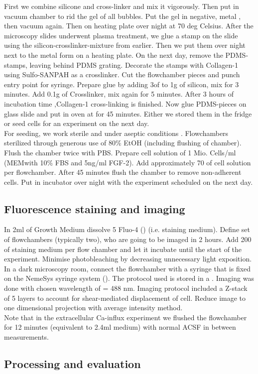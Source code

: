 First we combine silicone  and cross-linker  and mix it vigorously. Then put in vacuum chamber to rid the gel of all bubbles. Put the gel in negative, metal , then vacuum again. Then on heating plate over night at 70 deg Celsius. After the microscopy slides underwent plasma treatment, we glue a stamp on the slide using the silicon-crosslinker-mixture from earlier. Then we put them over night next to the metal form on a heating plate. On the next day, remove the PDMS-stamps, leaving behind PDMS grating. Decorate the stamps with Collagen-1  using Sulfo-SANPAH as a crosslinker. Cut the flowchamber pieces and punch entry point for syringe. Prepare glue by adding 3\mul of  to 1g of silicon, mix for 3 minutes. Add 0.1g of Crosslinker, mix again for 5 minutes. After 3 hours of incubation time ,Collagen-1 cross-linking is finished. Now glue PDMS-pieces on glass slide and put in oven at  for 45 minutes. Either we stored them in the fridge or seed cells for an experiment on the next day.\\
For seeding, we work sterile and under aseptic conditions . Flowchambers sterilized through generous use of 80\% EtOH (including flushing of chamber). Flush the chamber twice with PBS. Prepare cell solution of 1 Mio. Cells/ml (MEM\textalpha{ }with 10\% FBS and 5ng/ml FGF-2). Add approximately 70 \mul of cell solution per flowchamber. After 45 minutes flush the chamber to remove non-adherent cells. Put in incubator over night with the experiment scheduled on the next day.

\subsection{Fluorescence staining and imaging}
In 2ml of Growth Medium dissolve 5\mul{} Fluo-4 () (i.e. staining medium). Define set of flowchambers (typically two), who are going to be imaged in 2 hours. Add 200\mul{} of staining medium per flow chamber and let it incubate until the start of the experiment. Minimise photobleaching by decreasing unnecessary light exposition. In a dark microscopy room, connect the flowchamber with a syringe that is fixed on the NemeSys syringe system (). The protocol used is stored in a \myworries{}. Imaging was done with chosen wavelength of \textlambda = 488 nm.  Imaging protocol included a Z-stack of 5 layers to account for shear-mediated displacement of cell. Reduce image to one dimensional projection with average intensity method.  \\
Note that in the extracellular Ca-influx experiment we flushed the flowchamber for 12 minutes (equivalent to 2.4ml medium) with normal ACSF in between measurements.




\subsection{Processing and evaluation}

